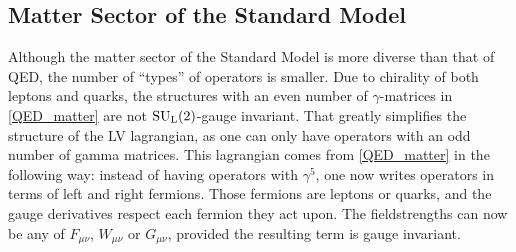 \documentclass[12pt]{revtex4}
\newcommand{\wt}{\widetilde}
\newcommand{\suc}{{\rm SU}_{\rm C}(3)}
\newcommand{\sul}{{\rm SU}_{\rm L}(2)}
\begin{document}


\subsection{Matter Sector of the Standard Model}
\label{matter_SM}
	Although the matter sector of the Standard Model is more diverse
	than that of QED, the number of ``types'' of operators is smaller.
	Due to chirality of both leptons and quarks, the structures 
	with an even number of $ \gamma $-matrices in \eqref{QED_matter}
	are not $ \sul $-gauge invariant. 
	That greatly simplifies the structure of the LV lagrangian,
	as one can only have operators with an odd number of gamma
	matrices.
	This lagrangian comes from \eqref{QED_matter} in the following way:
	instead of having operators with $ \gamma^5 $, one now writes
	operators in terms of left and right fermions. 
	Those fermions are leptons or quarks, and the gauge derivatives
	respect each fermion they act upon. 
	The fieldstrengths can now be any of $ F_{\mu\nu} $, 
	$ W_{\mu\nu} $ or $ G_{\mu\nu} $, provided the resulting term
	is gauge invariant. 
	
\end{document}
